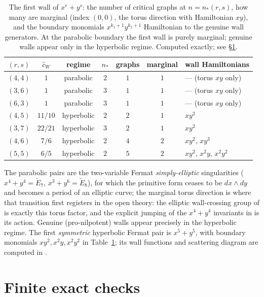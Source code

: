 \documentclass[11pt]{amsart}
\theoremstyle{definition}
\theoremstyle{remark}
\newcommand{\chat}{\hat{c}}
\begin{document}
\begin{table}[ht]
\centering
\begin{tabular}{ccccccl}
\toprule
$(r,s)$ & $\chat_{W}$ & regime & $n_{*}$ & graphs & marginal & wall Hamiltonians\\
\midrule
$(4,4)$ & $1$ & parabolic & $2$ & $1$ & $1$ & --- (torus $xy$ only)\\
$(3,6)$ & $1$ & parabolic & $3$ & $1$ & $1$ & --- (torus $xy$ only)\\
$(6,3)$ & $1$ & parabolic & $3$ & $1$ & $1$ & --- (torus $xy$ only)\\
$(4,5)$ & $11/10$ & hyperbolic & $2$ & $2$ & $1$ & $xy^{2}$\\
$(3,7)$ & $22/21$ & hyperbolic & $3$ & $2$ & $1$ & $xy^{2}$\\
$(4,6)$ & $7/6$ & hyperbolic & $2$ & $4$ & $2$ & $xy^{2},\,xy^{3}$\\
$(5,5)$ & $6/5$ & hyperbolic & $2$ & $5$ & $2$ & $xy^{2},\,x^{2}y,\,x^{2}y^{2}$\\
\bottomrule
\end{tabular}
\caption{The first wall of $x^{r}+y^{s}$: the number of critical graphs at
$n=n_{*}(r,s)$, how many are marginal (index $(0,0)$, the torus direction with
Hamiltonian $xy$), and the boundary monomials $x^{k_{1}+1}y^{k_{2}+1}$
Hamiltonian to the genuine wall generators. At the parabolic boundary the
first wall is purely marginal; genuine walls appear only in the hyperbolic
regime. Computed exactly; see \S\ref{sec:cert}.}
\label{tab:census}
\end{table}

The parabolic pairs are the two-variable Fermat \emph{simply-elliptic}
singularities ($x^{4}+y^{4}=\widetilde E_{7}$, $x^{3}+y^{6}=\widetilde E_{8}$),
for which the primitive form ceases to be $dx\wedge dy$ and becomes a period of
an elliptic curve; the marginal torus direction is where that transition first
registers in the open theory: the elliptic wall-crossing group of
\cite[\S5.2.2]{Maher} is exactly this torus factor, and the explicit jumping of
the $x^{4}+y^{4}$ invariants in \cite[Example~4.9]{GKTsurvey} is its action.
Genuine (pro-nilpotent) walls appear precisely in the hyperbolic regime. The
first \emph{symmetric} hyperbolic Fermat pair is $x^{5}+y^{5}$, with boundary
monomials $xy^{2},x^{2}y,x^{2}y^{2}$ in Table~\ref{tab:census}; its wall
functions and scattering diagram are computed in \cite{companion}.

\section{Finite exact checks}
\label{sec:cert}
\end{document}
